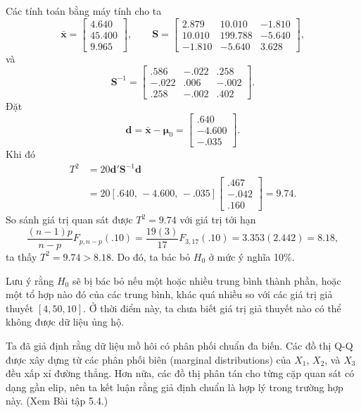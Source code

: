 Các tính toán bằng máy tính cho ta
\[
  \bar{\mathbf{x}} =
  \begin{bmatrix}
    4.640 \\
    45.400 \\
    9.965
  \end{bmatrix},
  \qquad
  \mathbf{S}=
  \begin{bmatrix}
    2.879 & 10.010 & -1.810 \\
    10.010 & 199.788 & -5.640 \\
    -1.810 & -5.640 & 3.628
  \end{bmatrix},
\]
và
\[
  \mathbf{S}^{-1}=
  \begin{bmatrix}
    .586 & -.022 & .258 \\
    -.022 & .006 & -.002 \\
    .258 & -.002 & .402
  \end{bmatrix}.
\]
Đặt
\[
  \mathbf{d}
  = \bar{\mathbf{x}}-\boldsymbol{\mu}_0
  = \begin{bmatrix} .640 \\ -4.600 \\ -.035 \end{bmatrix}.
\]
Khi đó
\[
\begin{aligned}
  T^2
  &= 20\mathbf{d}'\mathbf{S}^{-1}\mathbf{d} \\
  &= 20[.640,\,-4.600,\,-.035]
  \begin{bmatrix}
    .467 \\
    -.042 \\
    .160
  \end{bmatrix}
  = 9.74.
\end{aligned}
\]
So sánh giá trị quan sát được \(T^2=9.74\) với giá trị tới hạn
\[
  \frac{(n-1)p}{n-p}F_{p,n-p}(.10)
  = \frac{19(3)}{17}F_{3,17}(.10)
  = 3.353(2.442)
  = 8.18,
\]
ta thấy \(T^2=9.74>8.18\). Do đó, ta bác bỏ \(H_0\) ở mức ý nghĩa 10\%.

Lưu ý rằng \(H_0\) sẽ bị bác bỏ nếu một hoặc nhiều trung bình thành phần, hoặc một
tổ hợp nào đó của các trung bình, khác quá nhiều so với các giá trị giả thuyết
\([4,50,10]\). Ở thời điểm này, ta chưa biết giá trị giả thuyết nào có thể không
được dữ liệu ủng hộ.

Ta đã giả định rằng dữ liệu mồ hôi có phân phối chuẩn đa biến. Các đồ thị Q-Q
được xây dựng từ các phân phối biên (marginal distributions) của \(X_1\), \(X_2\),
và \(X_3\) đều xấp xỉ đường thẳng. Hơn nữa, các đồ thị phân tán cho từng cặp quan
sát có dạng gần elip, nên ta kết luận rằng giả định chuẩn là hợp lý trong trường hợp
này. (Xem Bài tập 5.4.)

